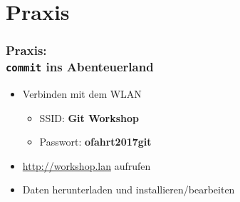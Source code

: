 \documentclass[accentcolor=tud8b,colorbacktitle,inverttitle,landscape,german,presentation,t]{tudbeamer}
\begin{document}
\section{Praxis}
			\begin{frame}
				\frametitle{Praxis:\\\texttt{commit} ins Abenteuerland}
					\begin{itemize}
						\item Verbinden mit dem WLAN
						\begin{itemize}
							\item SSID: \tab\textbf{Git Workshop}
							\item Passwort: \tab\textbf{ofahrt2017git}
						\end{itemize}
						\item \underline{http://workshop.lan} aufrufen
						\item Daten herunterladen und installieren/bearbeiten
					\end{itemize}
			\end{frame}			
			
			
\end{document}
